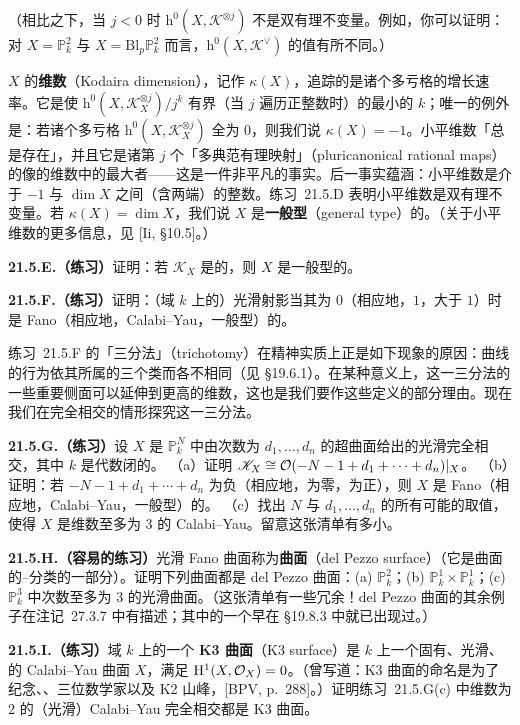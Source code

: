（相比之下，当 $j<0$ 时 $\mathrm{h}^0(X,\mathscr{K}^{\otimes j})$ 不是双有理不变量。例如，你可以证明：对 $X=\mathbb{P}^2_k$ 与 $X=\mathrm{Bl}_p\mathbb{P}^2_k$ 而言，$\mathrm{h}^0(X,\mathscr{K}^{\vee})$ 的值有所不同。）

$X$ 的\textbf{\trKodaira{}维数}（Kodaira dimension），记作 $\kappa(X)$，追踪的是诸个多亏格的增长速率。它是使 $\mathrm{h}^0(X,\mathscr{K}_X^{\otimes j})/j^k$ 有界（当 $j$ 遍历正整数时）的最小的 $k$；唯一的例外是：若诸个多亏格 $\mathrm{h}^0(X,\mathscr{K}_X^{\otimes j})$ 全为 $0$，则我们说 $\kappa(X)=-1$。小平维数「总是存在」，并且它是诸第 $j$ 个「多典范有理映射」（pluricanonical rational maps）的像的维数中的最大者——这是一件非平凡的事实。后一事实蕴涵：小平维数是介于 $-1$ 与 $\dim X$ 之间（含两端）的整数。\mbox{练习~21.5.D} 表明小平维数是双有理不变量。若 $\kappa(X)=\dim X$，我们说 $X$ 是\textbf{一般型}（general type）的。（关于小平维数的更多信息，见 [Ii, \S10.5]。）

\textbf{21.5.E.（练习）}\quad 证明：若 $\mathscr{K}_X$ 是\trAmple{}的，则 $X$ 是一般型的。

\textbf{21.5.F.（练习）}\quad 证明：（域 $k$ 上的）光滑\trGeometricallyIrreducible{}射影\trCurve{}当其\trGenus{}为 $0$（相应地，$1$，大于 $1$）时是 Fano（相应地，Calabi--Yau，一般型）的。

\mbox{练习~21.5.F} 的「三分法」（trichotomy）在精神实质上正是如下现象的原因：曲线的行为依其所属的三个类而各不相同（见 \S19.6.1）。在某种意义上，这一三分法的一些重要侧面可以延伸到更高的维数，这也是我们要作这些定义的部分理由。现在我们在完全相交的情形探究这一三分法。

\textbf{21.5.G.（练习）}\quad 设 $X$ 是 $\mathbb{P}^N_k$ 中由次数为 $d_1,\dots,d_n$ 的超曲面给出的光滑完全相交，其中 $k$ 是代数闭的。
（a）证明 $\mathscr{K}_X\cong\mathcal{O}(-N-1+d_1+\cdots+d_n)|_X$。
（b）证明：若 $-N-1+d_1+\cdots+d_n$ 为负（相应地，为零，为正），则 $X$ 是 Fano（相应地，Calabi--Yau，一般型）的。
（c）找出 $N$ 与 $d_1,\dots,d_n$ 的所有可能的取值，使得 $X$ 是维数至多为 $3$ 的 Calabi--Yau。留意这张清单有多小。

\textbf{21.5.H.（容易的练习）}\quad 光滑 Fano 曲面称为\textbf{\trDelPezzo{}曲面}（del Pezzo surface）（它是曲面的\trEnriques--\trKodaira{}分类的一部分）。证明下列曲面都是 del Pezzo 曲面：(a) $\mathbb{P}^2_k$；(b) $\mathbb{P}^1_k\times\mathbb{P}^1_k$；(c) $\mathbb{P}^3_k$ 中次数至多为 $3$ 的光滑曲面。（这张清单有一些冗余！del Pezzo 曲面的其余例子在\mbox{注记~27.3.7} 中有描述；其中的一个早在 \S19.8.3 中就已出现过。）

\textbf{21.5.I.（练习）}\quad 域 $k$ 上的一个 \textbf{K3 曲面}（K3 surface）是 $k$ 上一个固有、光滑、\trGeometricallyConnected{}的 Calabi--Yau 曲面 $X$，满足 $\mathrm{H}^1(X,\mathcal{O}_X)=0$。（\trWeil{}曾写道：K3 曲面的命名是为了纪念\trKummer、\trKahler、\trKodaira{}三位数学家以及 K2 山峰，[BPV, p.~288]。）证明\mbox{练习~21.5.G(c)} 中维数为 $2$ 的（光滑）Calabi--Yau 完全相交都是 K3 曲面。

